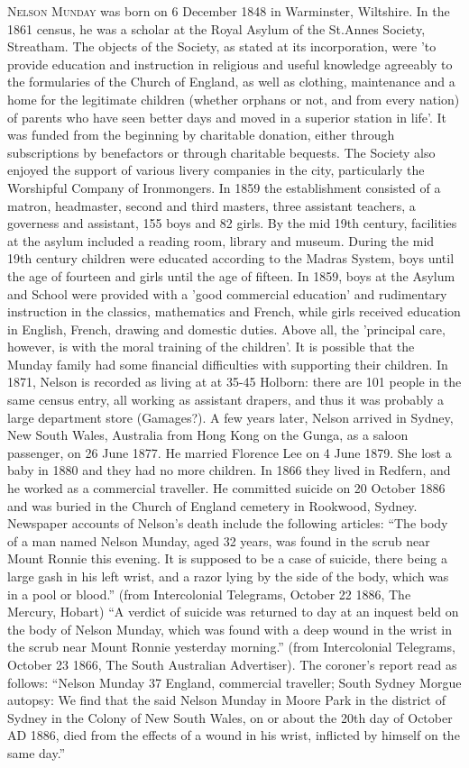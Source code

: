 \textsc{Nelson Munday} was born on 6 December 1848 in	Warminster, Wiltshire. In the 1861 census, he was a scholar at the Royal Asylum of the St.Annes Society, Streatham. The objects of the Society, as stated at its incorporation, were 'to provide education and instruction in religious and useful knowledge agreeably to the formularies of the Church of England, as well as clothing, maintenance and a home for the legitimate children (whether orphans or not, and from every nation) of parents who have seen better days and moved in a superior station in life'. It was funded from the beginning by charitable donation, either through subscriptions by benefactors or through charitable bequests. The Society also enjoyed the support of various livery companies in the city, particularly the Worshipful Company of Ironmongers. In 1859 the establishment consisted of a matron, headmaster, second and third masters, three assistant teachers, a governess and assistant, 155 boys and 82 girls. By the mid 19th century, facilities at the asylum included a reading room, library and museum. During the mid 19th century children were educated according to the Madras System, boys until the age of fourteen and girls until the age of fifteen. In 1859, boys at the Asylum and School were provided with a 'good commercial education' and rudimentary instruction in the classics, mathematics and French, while girls received education in English, French, drawing and domestic duties. Above all, the 'principal care, however, is with the moral training of the children'. It is possible that the Munday family had some financial difficulties with supporting their children.
In 1871, Nelson is recorded as living at at 35-45 Holborn: there are 101 people in the same census entry, all working as assistant drapers, and thus it was probably a large department store (Gamages?). A few years later, Nelson arrived in Sydney, New South Wales, Australia from Hong Kong on the Gunga, as a saloon passenger, on 26 June 1877. He married Florence Lee on 4 June 1879. She lost a baby in 1880 and they had no more children. In 1866 they lived in Redfern, and he worked as a commercial traveller.  He committed suicide on 20 October 1886 and was buried in the Church of England cemetery in Rookwood, Sydney.
Newspaper accounts of Nelson's death include the following articles: 
  ``The body of a man named Nelson Munday, aged 32 years, was found in the scrub near Mount Ronnie this evening. It is supposed to be a case of suicide, there being a large gash in his left wrist, and a razor lying by the side of the body, which was in a pool or blood.'' (from Intercolonial Telegrams, October 22 1886, The Mercury, Hobart) 
 ``A verdict of suicide was returned to day at an inquest beld on the body of Nelson Munday, which was found with a deep wound in the wrist in the scrub near Mount Ronnie yesterday morning.'' (from Intercolonial Telegrams, October 23 1866, The South Australian Advertiser). The coroner's report read as follows: 
``Nelson Munday 37 England, commercial traveller; South Sydney Morgue autopsy:
We find that the said Nelson Munday in Moore Park in the district of Sydney in the Colony of New South Wales, on or about the 20th day of October AD 1886, died from the effects of a wound in his wrist, inflicted by himself on the same day.''

